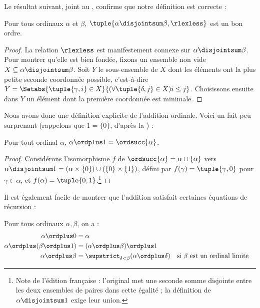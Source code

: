 \documentclass[../../../include/open-logic-section]{subfiles}
\begin{document}
Le résultat suivant, joint au
,
confirme que notre définition est correcte :

\begin{lem}
Pour tous ordinaux $\alpha$ et $\beta$,
$\tuple{\alpha \disjointsum \beta, \rlexless}$
est un bon ordre.
\end{lem}

\begin{proof}
La relation $\rlexless$ est manifestement connexe sur
$\alpha \disjointsum \beta$. Pour montrer qu'elle est
bien fondée, fixons un ensemble non vide
$X \subseteq \alpha \disjointsum \beta$.
Soit $Y$ le sous-ensemble de $X$ dont les éléments
ont la plus petite seconde coordonnée possible,
c'est-à-dire
$Y = \Setabs{\tuple{\gamma, i} \in X}
{(\forall \tuple{\delta, j} \in X)i \leq j}$.
Choisissons ensuite dans $Y$ un élément dont
la première coordonnée est minimale.
\end{proof}
\noindent
Nous avons donc une définition explicite de l'addition
ordinale. Voici un fait peu surprenant (rappelons que
$1 = \{0\}$, d'après la ) :
\begin{prop}
Pour tout ordinal $\alpha$,
$\alpha \ordplus  1 = \ordsucc{\alpha}$.
\end{prop}

\begin{proof}
Considérons l'isomorphisme $f$ de
$\ordsucc{\alpha} = \alpha \cup \{\alpha\}$ vers
$\alpha\disjointsum1 = (\alpha \times \{0\})
\cup (\{0\} \times \{1\})$, défini par
$f(\gamma) = \tuple{\gamma, 0}$ pour
$\gamma \in \alpha$, et
$f(\alpha) = \tuple{0, 1}$.\footnote{Note de l'édition
française : l'original met une seconde somme disjointe
entre les deux ensembles de paires dans cette égalité ;
la définition de $\alpha\disjointsum1$ exige leur union.}
\end{proof}
\noindent
Il est également facile de montrer que l'addition
satisfait certaines équations de récursion :

\begin{lem}
Pour tous ordinaux $\alpha, \beta$, on a :
\begin{align*}
	\alpha\ordplus 0 &= \alpha\\
	\alpha \ordplus  (\beta\ordplus 1)
	&= (\alpha \ordplus  \beta) \ordplus  1\\
	\alpha  \ordplus  \beta
	&= \supstrict_{\delta < \beta}(\alpha \ordplus  \delta)
	&& \text{si $\beta$ est un ordinal limite}
\end{align*}
\end{lem}
\end{document}
